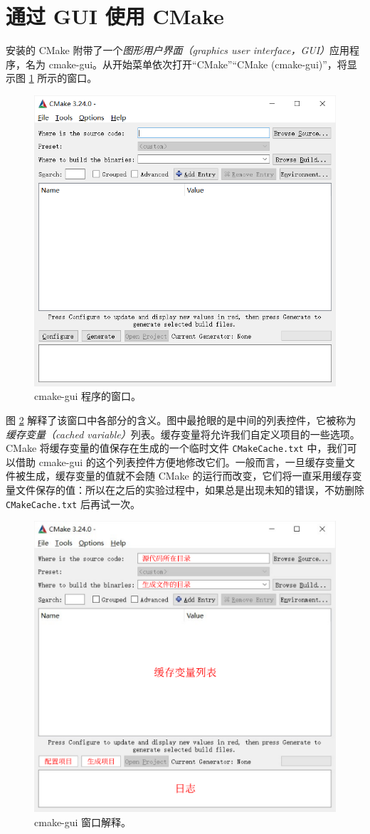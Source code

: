 
\section{通过 GUI 使用 CMake}

安装的 CMake 附带了一个\emph{图形用户界面（graphics user interface，GUI）}应用程序，名为 cmake-gui。从开始菜单依次打开“CMake”“CMake (cmake-gui)”，将显示图 \ref{fig:cmake-gui-1} 所示的窗口。

\begin{figure}
	\centering
	\includegraphics[width=0.6\linewidth]{assets/cmake-gui-1}
	\caption{cmake-gui 程序的窗口。}
	\label{fig:cmake-gui-1}
\end{figure}

图 \ref{fig:cmake-gui-2} 解释了该窗口中各部分的含义。图中最抢眼的是中间的列表控件，它被称为\emph{缓存变量（cached variable）}列表。缓存变量将允许我们自定义项目的一些选项。CMake 将缓存变量的值保存在生成的一个临时文件 \lstinline[language={}]{CMakeCache.txt} 中，我们可以借助 cmake-gui 的这个列表控件方便地修改它们。一般而言，一旦缓存变量文件被生成，缓存变量的值就不会随 CMake 的运行而改变，它们将一直采用缓存变量文件保存的值：所以在之后的实验过程中，如果总是出现未知的错误，不妨删除 \lstinline[language={}]{CMakeCache.txt} 后再试一次。

\begin{figure}
	\centering
	\includegraphics[width=0.6\linewidth]{assets/cmake-gui-2}
	\caption{cmake-gui 窗口解释。}
	\label{fig:cmake-gui-2}
\end{figure}

